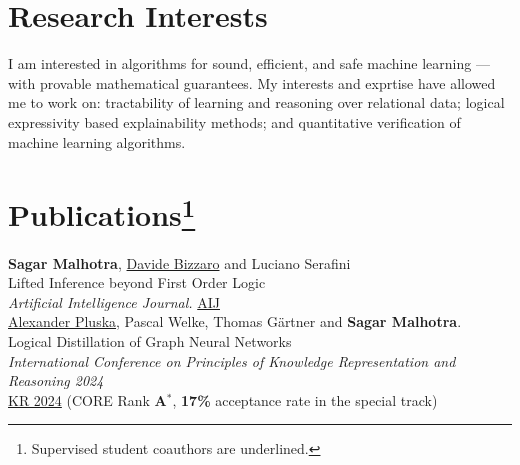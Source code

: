\documentclass[10pt, a4paper]{article}
\newcommand{\years}[1]{\marginnote{\scriptsize #1}}
\begin{document}
\section*{Research Interests}
I am interested in algorithms for sound, efficient, and safe machine learning --- with provable mathematical guarantees. 
My interests and exprtise have allowed me to work on: tractability of learning and reasoning over relational data; logical expressivity based explainability methods; and quantitative verification of machine learning algorithms. 






\section*{Publications\protect\footnote{Supervised student coauthors are underlined.}}
\years{2025}\textbf{Sagar Malhotra}, \underline{Davide Bizzaro} and Luciano Serafini\\
Lifted Inference beyond First Order Logic \\
\emph{Artificial Intelligence Journal.} \href{https://doi.org/10.1016/j.artint.2025.104310}{AIJ}\\ 

\years{2024}\underline{Alexander Pluska}, Pascal Welke, Thomas G{\"a}rtner and \textbf{Sagar Malhotra}.\\
Logical Distillation of Graph Neural Networks\\
\emph{International Conference on Principles of Knowledge Representation and Reasoning 2024} \\
\href{https://arxiv.org/abs/2406.07126}{KR 2024} (CORE Rank \textbf{A$^{*}$}, \textbf{17\%} acceptance rate in the special track)\\
\end{document}
